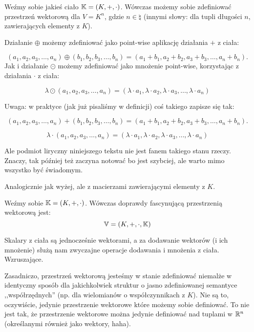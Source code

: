 \begin{example}
	Weźmy sobie jakieś ciało \(\mathbb{K} = (K, +, \cdot)\). Wówczas możemy sobie zdefiniować przestrzeń wektorową dla \(V = K^n\), gdzie \(n \in \natural\) (innymi słowy: dla tupli długości \(n\), zawierających elementy z \(K\)).

	Działanie \(\oplus\) możemy zdefiniować jako point-wise aplikację działania \(+\) z ciała:

	\[
		(a_1, a_2, a_3, \dots, a_n) \oplus (b_1, b_2, b_3, \dots, b_n) = (a_1 + b_1, a_2 + b_2, a_3 + b_3, \dots, a_n + b_n).
	\]
	Jak i działanie \(\odot\) możemy zdefiniować jako mnożenie point-wise, korzystając z działania \( \cdot \) z ciała:

	\[
		\lambda \odot (a_1, a_2, a_3, \dots, a_n) = (\lambda \cdot a_1, \lambda \cdot a_2, \lambda \cdot a_3, \dots, \lambda \cdot a_n)
	\]

	Uwaga: w praktyce (jak już pisaliśmy w definicji) coś takiego zapisze się tak:

	\[
		(a_1, a_2, a_3, \dots, a_n) + (b_1, b_2, b_3, \dots, b_n) = (a_1 + b_1, a_2 + b_2, a_3 + b_3, \dots, a_n + b_n).
	\]

	\[
		\lambda \cdot (a_1, a_2, a_3, \dots, a_n) = (\lambda \cdot a_1, \lambda \cdot a_2, \lambda \cdot a_3, \dots, \lambda \cdot a_n)
	\]

	Ale podmiot liryczny niniejszego tekstu nie jest fanem takiego stanu rzeczy. Znaczy, tak później też zaczyna notować bo jest szybciej, ale warto mimo wszystko być świadomym.
\end{example}

\begin{example}
	Analogicznie jak wyżej, ale z macierzami zawierającymi elementy z \(K\).
\end{example}

\begin{example}
	\label{fascinating}
	Weźmy sobie \(\mathbb{K} = (K, +, \cdot)\). Wówczas doprawdy fascynującą przestrzenią wektorową jest:
	\[
		\mathbb{V} = (K, +, \cdot, \mathbb{K})
	\]

	Skalary z ciała są jednocześnie wektorami, a za dodawanie wektorów (i ich mnożenie) służą nam zwyczajne operacje dodawania i mnożenia z ciała. Wzruszające.
\end{example}

Zasadniczo, przestrzeń wektorową jesteśmy w stanie zdefiniować niemalże w identyczny sposób dla jakichkolwiek struktur o jasno zdefiniowanej semantyce ,,współrzędnych'' (np. dla wielomianów o współczynnikach z \(K\)). Nie są to, oczywiście, jedynie przestrzenie wektorowe które możemy sobie definiować. To nie jest tak, że przestrzenie wektorowe można jedynie definiować nad tuplami w \(\mathbb{R}^{n}\) (określanymi również jako wektory, haha).


